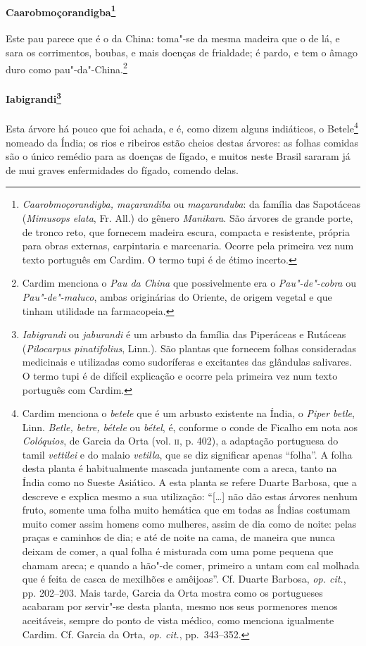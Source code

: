 \paragraph{Caarobmoçorandigba\footnote{ \textit{Caarobmoçorandigba,
maçarandiba} ou \textit{maçaranduba}: da família das Sapotáceas
(\textit{Mimusops elata}, Fr. All.) do gênero \textit{Manikara}. São
árvores de grande porte, de tronco reto, que fornecem madeira escura,
compacta e resistente, própria para obras externas, carpintaria e
marcenaria. Ocorre pela primeira vez num texto português em Cardim. O
termo tupi é de étimo incerto.}} Este pau parece
que é o da China: toma"-se da mesma madeira que o de lá, e sara os
corrimentos, boubas, e mais doenças de frialdade; é pardo, e tem o
âmago duro como pau"-da"-China.\footnote{ Cardim menciona o \textit{Pau
da China} que possivelmente era o \textit{Pau"-de"-cobra} ou
\textit{Pau"-de"-maluco}, ambas originárias do Oriente, de origem vegetal
e que tinham utilidade na farmacopeia.} 

\paragraph{Iabigrandi\footnote{ \textit{Iabigrandi} ou \textit{jaburandi}
é um arbusto da família das Piperáceas e Rutáceas 
(\textit{Pilocarpus pinatifolius}, Linn.). São plantas que fornecem
folhas consideradas medicinais e utilizadas como sudoríferas e
excitantes das glândulas salivares. O termo tupi é de difícil
explicação e ocorre pela primeira vez num texto português com Cardim.}}
 Esta árvore há pouco que foi achada, e é, como dizem
alguns indiáticos, o Betele\footnote{ Cardim menciona o \textit{betele}
que é um arbusto existente na Índia, o \textit{Piper betle}, Linn.
\textit{Betle, betre, bétele} ou \textit{bétel}, é, conforme o conde de
Ficalho em nota aos \textit{Colóquios}, de Garcia da Orta (vol. \textsc{ii},
p. 402), a adaptação portuguesa do tamil \textit{vettilei} e do malaio
\textit{vetilla}, que se diz significar apenas ``folha''. A folha desta
planta é habitualmente mascada juntamente com a areca, tanto na Índia
como no Sueste Asiático. A esta planta se refere Duarte Barbosa, que a
descreve e explica mesmo a sua utilização: ``[\ldots{}] não dão estas
árvores nenhum fruto, somente uma folha muito hemática que em todas as
Índias costumam muito comer assim homens como mulheres, assim de dia
como de noite: pelas praças e caminhos de dia; e até de noite na cama,
de maneira que nunca deixam de comer, a qual folha é misturada com uma
pome pequena que chamam areca; e quando a hão"-de comer, primeiro a
untam com cal molhada que é feita de casca de mexilhões e amêijoas''. 
Cf. Duarte Barbosa, \textit{op. cit.}, pp. 202--203. Mais tarde, Garcia
da Orta mostra como os portugueses acabaram por servir"-se desta planta,
mesmo nos seus pormenores menos aceitáveis, sempre do ponto de vista
médico, como menciona igualmente Cardim. Cf. Garcia da Orta,
\textit{op. cit.}, pp.~343--352.} nomeado da Índia; os rios e ribeiros
estão cheios destas árvores: as folhas comidas são o único remédio para
as doenças de fígado, e muitos neste Brasil sararam já de mui graves
enfermidades do fígado, comendo delas.

